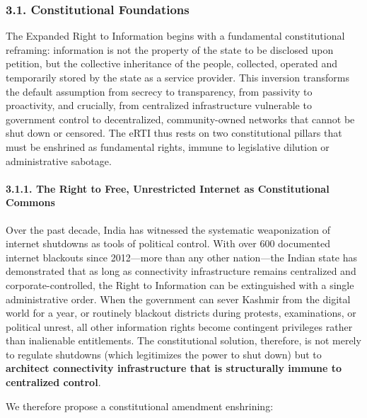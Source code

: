 \subsubsection{3.1. Constitutional
Foundations}\label{constitutional-foundations}

The Expanded Right to Information begins with a fundamental
constitutional reframing: information is not the property of the state
to be disclosed upon petition, but the collective inheritance of the
people, collected, operated and temporarily stored by the state as a
service provider. This inversion transforms the default assumption from
secrecy to transparency, from passivity to proactivity, and crucially,
from centralized infrastructure vulnerable to government control to
decentralized, community-owned networks that cannot be shut down or
censored. The eRTI thus rests on two constitutional pillars that must be
enshrined as fundamental rights, immune to legislative dilution or
administrative sabotage.

\paragraph{3.1.1. The Right to Free, Unrestricted Internet as
Constitutional
Commons}\label{the-right-to-free-unrestricted-internet-as-constitutional-commons}

Over the past decade, India has witnessed the systematic weaponization
of internet shutdowns as tools of political control. With over 600
documented internet blackouts since 2012---more than any other
nation---the Indian state has demonstrated that as long as connectivity
infrastructure remains centralized and corporate-controlled, the Right
to Information can be extinguished with a single administrative order.
When the government can sever Kashmir from the digital world for a year,
or routinely blackout districts during protests, examinations, or
political unrest, all other information rights become contingent
privileges rather than inalienable entitlements. The constitutional
solution, therefore, is not merely to regulate shutdowns (which
legitimizes the power to shut down) but to \textbf{architect
connectivity infrastructure that is structurally immune to centralized
control}.

We therefore propose a constitutional amendment enshrining:

